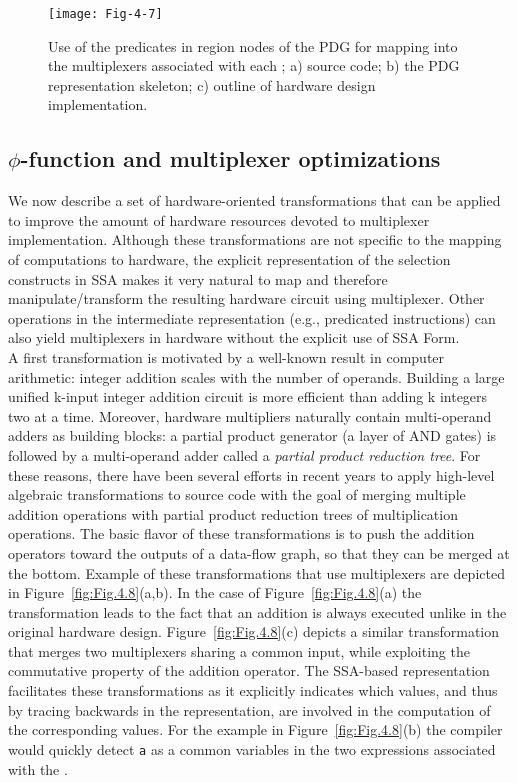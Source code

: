\begin{figure}[htb]
\centering
\texttt{[image: Fig-4-7]}
\caption{Use of the predicates in region nodes of the PDG for mapping 
into the multiplexers associated with each \phifun; a) source code; b)
the PDG representation skeleton; c) outline of hardware design implementation.}
\label{fig:Fig.4.7}
\end{figure}


\subsection{$\phi$-function and multiplexer optimizations}

We now describe a set of hardware-oriented transformations that can 
be applied to improve the amount of hardware resources devoted to 
multiplexer implementation.
Although these transformations are not specific to the mapping of
computations to hardware, the explicit representation
of the selection constructs in SSA makes it very natural to map and
therefore manipulate/transform the resulting hardware circuit
using multiplexer. Other operations in the intermediate 
representation (e.g., predicated instructions) can also yield
multiplexers in hardware without the explicit use of SSA Form.\\

A first transformation is motivated by a well-known result in computer 
arithmetic: integer addition scales with the number of operands. 
Building a large unified k-input integer addition circuit is more
efficient than adding k integers two at a time. 
Moreover, hardware multipliers naturally contain multi-operand adders 
as building blocks: a partial product generator (a layer of AND gates) 
is followed by a multi-operand adder called a {\em partial product reduction tree}. 
For these reasons, there have been several efforts in recent years to 
apply high-level algebraic transformations to source code
with the goal of merging multiple addition operations with
partial product reduction trees of multiplication operations.
The basic flavor of these transformations is to push the 
addition operators toward the outputs of a data-flow graph, so that 
they can be merged at the bottom. Example of these transformations 
that use multiplexers are depicted in Figure~\ref{fig:Fig.4.8}(a,b). 
In the case of Figure~\ref{fig:Fig.4.8}(a) the transformation
leads to the fact that an addition is always executed unlike in
the original hardware design. 
Figure~\ref{fig:Fig.4.8}(c) depicts a similar transformation that 
merges two multiplexers sharing a common input, while exploiting
the commutative property of the addition operator.
The SSA-based representation facilitates these transformations
as it explicitly indicates which values, and thus by tracing backwards
in the representation, are involved in the computation of the corresponding
values. For the example in Figure~\ref{fig:Fig.4.8}(b) the compiler
would quickly detect {\tt a} as a common variables in the two 
expressions associated with the \phifun.\\

